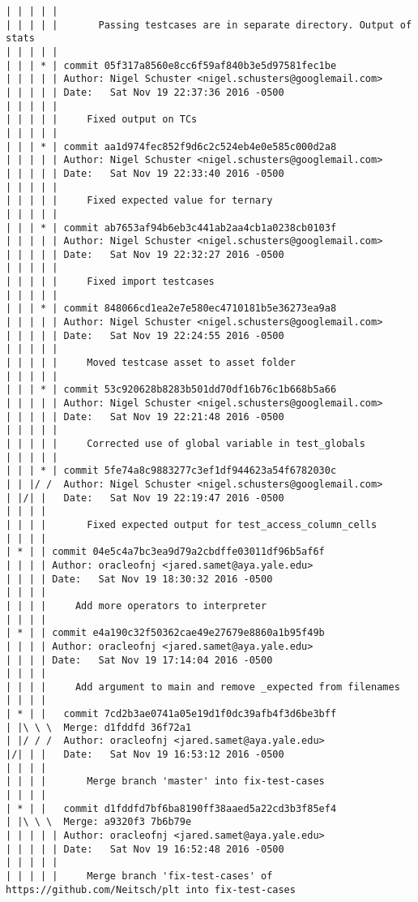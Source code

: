 \begin{lstlisting}
| | | | |   
| | | | |       Passing testcases are in separate directory. Output of stats
| | | | |      
| | | * | commit 05f317a8560e8cc6f59af840b3e5d97581fec1be
| | | | | Author: Nigel Schuster <nigel.schusters@googlemail.com>
| | | | | Date:   Sat Nov 19 22:37:36 2016 -0500
| | | | | 
| | | | |     Fixed output on TCs
| | | | |      
| | | * | commit aa1d974fec852f9d6c2c524eb4e0e585c000d2a8
| | | | | Author: Nigel Schuster <nigel.schusters@googlemail.com>
| | | | | Date:   Sat Nov 19 22:33:40 2016 -0500
| | | | | 
| | | | |     Fixed expected value for ternary
| | | | |      
| | | * | commit ab7653af94b6eb3c441ab2aa4cb1a0238cb0103f
| | | | | Author: Nigel Schuster <nigel.schusters@googlemail.com>
| | | | | Date:   Sat Nov 19 22:32:27 2016 -0500
| | | | | 
| | | | |     Fixed import testcases
| | | | |      
| | | * | commit 848066cd1ea2e7e580ec4710181b5e36273ea9a8
| | | | | Author: Nigel Schuster <nigel.schusters@googlemail.com>
| | | | | Date:   Sat Nov 19 22:24:55 2016 -0500
| | | | | 
| | | | |     Moved testcase asset to asset folder
| | | | |      
| | | * | commit 53c920628b8283b501dd70df16b76c1b668b5a66
| | | | | Author: Nigel Schuster <nigel.schusters@googlemail.com>
| | | | | Date:   Sat Nov 19 22:21:48 2016 -0500
| | | | | 
| | | | |     Corrected use of global variable in test_globals
| | | | |      
| | | * | commit 5fe74a8c9883277c3ef1df944623a54f6782030c
| | |/ /  Author: Nigel Schuster <nigel.schusters@googlemail.com>
| |/| |   Date:   Sat Nov 19 22:19:47 2016 -0500
| | | |   
| | | |       Fixed expected output for test_access_column_cells
| | | |     
| * | | commit 04e5c4a7bc3ea9d79a2cbdffe03011df96b5af6f
| | | | Author: oracleofnj <jared.samet@aya.yale.edu>
| | | | Date:   Sat Nov 19 18:30:32 2016 -0500
| | | | 
| | | |     Add more operators to interpreter
| | | |     
| * | | commit e4a190c32f50362cae49e27679e8860a1b95f49b
| | | | Author: oracleofnj <jared.samet@aya.yale.edu>
| | | | Date:   Sat Nov 19 17:14:04 2016 -0500
| | | | 
| | | |     Add argument to main and remove _expected from filenames
| | | |       
| * | |   commit 7cd2b3ae0741a05e19d1f0dc39afb4f3d6be3bff
| |\ \ \  Merge: d1fddfd 36f72a1
| |/ / /  Author: oracleofnj <jared.samet@aya.yale.edu>
|/| | |   Date:   Sat Nov 19 16:53:12 2016 -0500
| | | |   
| | | |       Merge branch 'master' into fix-test-cases
| | | |       
| * | |   commit d1fddfd7bf6ba8190ff38aaed5a22cd3b3f85ef4
| |\ \ \  Merge: a9320f3 7b6b79e
| | | | | Author: oracleofnj <jared.samet@aya.yale.edu>
| | | | | Date:   Sat Nov 19 16:52:48 2016 -0500
| | | | | 
| | | | |     Merge branch 'fix-test-cases' of https://github.com/Neitsch/plt into fix-test-cases

\end{lstlisting}
